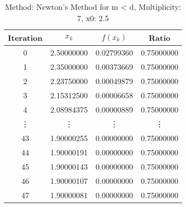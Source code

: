 \begin{table}
\centering
\caption{Method: Newton's Method for m < d, Multiplicity: 7, x0: 2.5}
\label{tab:table_Newton's_Method_for_m_<_d_7_2_5}
\begin{tabular}{c c c c}
\toprule
Iteration &      $x_k$ &   $f(x_k)$ &      Ratio \\
\midrule
        0 & 2.50000000 & 0.02799360 & 0.75000000 \\
        1 & 2.35000000 & 0.00373669 & 0.75000000 \\
        2 & 2.23750000 & 0.00049879 & 0.75000000 \\
        3 & 2.15312500 & 0.00006658 & 0.75000000 \\
        4 & 2.08984375 & 0.00000889 & 0.75000000 \\
   \vdots &     \vdots &     \vdots &     \vdots \\
       43 & 1.90000255 & 0.00000000 & 0.75000000 \\
       44 & 1.90000191 & 0.00000000 & 0.75000000 \\
       45 & 1.90000143 & 0.00000000 & 0.75000000 \\
       46 & 1.90000107 & 0.00000000 & 0.75000000 \\
       47 & 1.90000081 & 0.00000000 & 0.75000000 \\
\bottomrule
\end{tabular}
\end{table}
